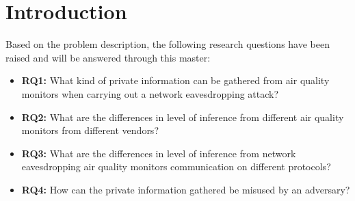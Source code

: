 \chapter*{Introduction}

Based on the problem description, the following research questions have been raised and will be answered through this master:
\begin{itemize}
    \item 
    \textbf{RQ1:} What kind of private information can be gathered from air quality monitors when carrying out a network eavesdropping attack?
    \item 
    \textbf{RQ2:} What are the differences in level of inference from different air quality monitors from different vendors?
    \item
    \textbf{RQ3:} What are the differences in level of inference from network eavesdropping air quality monitors communication on different protocols?
    \item 
    \textbf{RQ4:} How can the private information gathered be misused by an adversary?
\end{itemize}